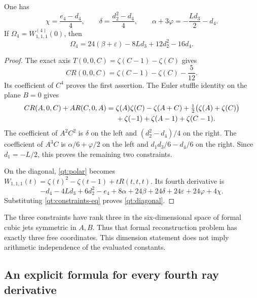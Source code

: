 \begin{proposition}\label{qt:constraints}
One has
\begin{equation}\label{qt:constraints-eq}
 \chi=\frac{e_4-d_4}{4},\qquad
 \delta=\frac{d_2^2-d_4}{4},\qquad
 \alpha+3\varphi=-\frac{Ld_3}{2}-d_4.
\end{equation}
If $\Omega_4=W_{1,1,1}^{(4)}(0)$, then
\begin{equation}\label{qt:diagonal}
 \boxed{\Omega_4=24(\beta+\varepsilon)-8Ld_3+12d_2^2-16d_4.}
\end{equation}
\end{proposition}
\begin{proof}
The exact axis $T(0,0,C)=\zeta(C-1)-\zeta(C)$ gives
\[
 C R(0,0,C)=\zeta(C-1)-\zeta(C)-\frac5{12}.
\]
Its coefficient of $C^4$ proves the first assertion.
The Euler stuffle identity on the plane $B=0$ gives
\begin{align}\label{qt:stuffle}
 C R(A,0,C)+A R(C,0,A)
 ={}&\zeta(A)\zeta(C)-\zeta(A+C)
 +\tfrac12\bigl(\zeta(A)+\zeta(C)\bigr)\notag\\
 &+\zeta(-1)+\zeta(A-1)+\zeta(C-1).
\end{align}
The coefficient of $A^2C^2$ is $\delta$ on the left and
$(d_2^2-d_4)/4$ on the right. The coefficient of $A^3C$ is
$\alpha/6+\varphi/2$ on the left and
$d_1d_3/6-d_4/6$ on the right. Since $d_1=-L/2$, this proves
the remaining two constraints.

On the diagonal, \eqref{qt:polar} becomes
$W_{1,1,1}(t)=\zeta(t)^2-\zeta(t-1)+tR(t,t,t)$.
Its fourth derivative is
\[
 -d_4-4Ld_3+6d_2^2-e_4
 +8\alpha+24\beta+24\delta+24\varepsilon+24\varphi+4\chi.
\]
Substituting \eqref{qt:constraints-eq} proves \eqref{qt:diagonal}.
\end{proof}

The three constraints have rank three in the six-dimensional space of
formal cubic jets symmetric in $A,B$. Thus that formal reconstruction
problem has exactly three free coordinates. This dimension statement
does not imply arithmetic independence of the evaluated constants.

\subsection{An explicit formula for every fourth ray derivative}

